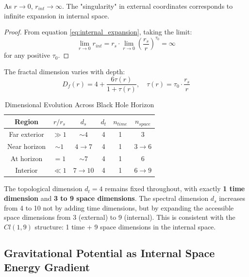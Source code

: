 \begin{corollary}
As $r \to 0$, $r_{int} \to \infty$. The "singularity" in external coordinates corresponds to infinite expansion in internal space.
\end{corollary}

\begin{proof}
From equation \eqref{eq:internal_expansion}, taking the limit:
\begin{equation}
    \lim_{r \to 0} r_{int} = r_s \cdot \lim_{r \to 0} \left(\frac{r_s}{r}\right)^{\tau_0} = \infty
\end{equation}
for any positive $\tau_0$.
\end{proof}

The fractal dimension varies with depth:
\begin{equation}
    D_f(r) = 4 + \frac{6\tau(r)}{1 + \tau(r)}, \quad \tau(r) = \tau_0 \cdot \frac{r_s}{r}
\end{equation}

\begin{table}[htbp]
\centering
\caption{Dimensional Evolution Across Black Hole Horizon}
\begin{tabular}{@{}cccccc@{}}
\toprule
Region & $r/r_s$ & $d_s$ & $d_t$ & $n_{time}$ & $n_{space}$ \\
\midrule
Far exterior & $\gg 1$ & $\sim 4$ & 4 & 1 & 3 \\
Near horizon & $\sim 1$ & $4 \to 7$ & 4 & 1 & $3 \to 6$ \\
At horizon & $= 1$ & $\sim 7$ & 4 & 1 & 6 \\
Interior & $\ll 1$ & $7 \to 10$ & 4 & 1 & $6 \to 9$ \\
\bottomrule
\end{tabular}
\label{tab:dimensional_evolution}
\end{table}

\begin{remark}
The topological dimension $d_t = 4$ remains fixed throughout, with exactly \textbf{1 time dimension} and \textbf{3 to 9 space dimensions}. The spectral dimension $d_s$ increases from 4 to 10 not by adding time dimensions, but by expanding the accessible space dimensions from 3 (external) to 9 (internal). This is consistent with the $Cl(1,9)$ structure: 1 time + 9 space dimensions in the internal space.
\end{remark}

\subsection{Gravitational Potential as Internal Space Energy Gradient}

